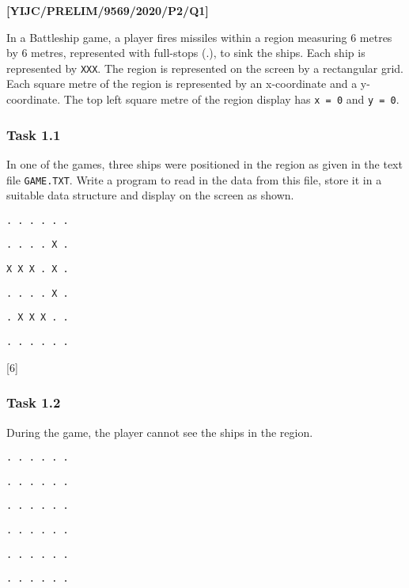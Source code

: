 \item \textbf{{[}YIJC/PRELIM/9569/2020/P2/Q1{]} }

In a Battleship game, a player fires missiles within a region measuring
6 metres by 6 metres, represented with full-stops (\textquotedbl .\textquotedbl ),
to sink the ships. Each ship is represented by \textquotedbl\texttt{XXX}\textquotedbl .
The region is represented on the screen by a rectangular grid. Each
square metre of the region is represented by an x-coordinate and a
y-coordinate. The top left square metre of the region display has
\texttt{x = 0} and \texttt{y = 0}. 

\subsubsection*{Task 1.1}

In one of the games, three ships were positioned in the region as
given in the text file \texttt{GAME.TXT}. Write a program to read
in the data from this file, store it in a suitable data structure
and display on the screen as shown.

\noindent %
\noindent\begin{minipage}[t]{1\columnwidth}%
\texttt{. . . . . . }

\texttt{. . . . X . }

\texttt{X X X . X . }

\texttt{. . . . X . }

\texttt{. X X X . . }

\texttt{. . . . . . }%
\end{minipage}

\hfill{}{[}6{]}

\subsubsection*{Task 1.2}

During the game, the player cannot see the ships in the region.

\noindent %
\noindent\begin{minipage}[t]{1\columnwidth}%
\texttt{. . . . . . }

\texttt{. . . . . . }

\texttt{. . . . . . }

\texttt{. . . . . . }

\texttt{. . . . . . }

\texttt{. . . . . .}%
\end{minipage}

